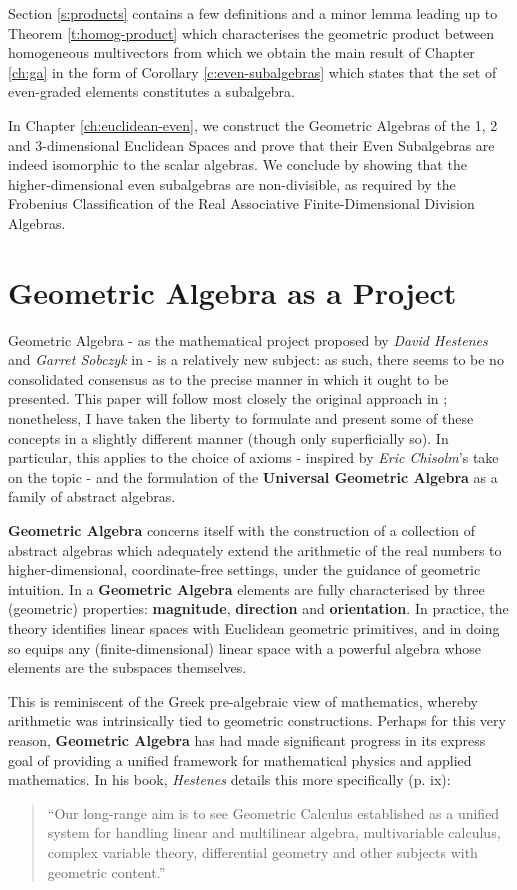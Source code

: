 Section \ref{s:products} contains a few definitions and a minor lemma leading up to Theorem \ref{t:homog-product} which characterises the geometric product between homogeneous multivectors from which we obtain the main result of Chapter \ref{ch:ga} in the form of Corollary \ref{c:even-subalgebras} which states that the set of even-graded elements constitutes a subalgebra.

In Chapter \ref{ch:euclidean-even}, we construct the Geometric Algebras of the 1, 2 and 3-dimensional Euclidean Spaces and prove that their Even Subalgebras are indeed isomorphic to the scalar algebras. We conclude by showing that the higher-dimensional even subalgebras are non-divisible, as required by the Frobenius Classification of the Real Associative Finite-Dimensional Division Algebras.

\newpage

\section{Geometric Algebra as a Project}
Geometric Algebra - as the mathematical project proposed by \textit{David Hestenes} and \textit{Garret Sobczyk} in \cite{ga-origin} - is a relatively new subject: as such, there seems to be no consolidated consensus as to the precise manner in which it ought to be presented. This paper will follow most closely the original approach in \cite{ga-origin}; nonetheless, I have taken the liberty to formulate and present some of these concepts in a slightly different manner (though only superficially so). In particular, this applies to the choice of axioms - inspired by \textit{Eric Chisolm}'s take on the topic \cite{ga-chisolm} - and the formulation of the \textbf{Universal Geometric Algebra} as a family of abstract algebras.

\textbf{Geometric Algebra} concerns itself with the construction of a collection of abstract algebras which adequately extend the arithmetic of the real numbers to higher-dimensional, coordinate-free settings, under the guidance of geometric intuition. In a \textbf{Geometric Algebra} elements are fully characterised by three (geometric) properties: \textbf{magnitude}, \textbf{direction} and \textbf{orientation}. In practice, the theory identifies linear spaces with Euclidean geometric primitives, and in doing so equips any (finite-dimensional) linear space with a powerful algebra whose elements are the subspaces themselves.

This is reminiscent of the Greek pre-algebraic view of mathematics, whereby arithmetic was intrinsically tied to geometric constructions. 
Perhaps for this very reason, \textbf{Geometric Algebra} has had made significant progress in its express goal of providing a unified framework for mathematical physics and applied mathematics. In his book, \textit{Hestenes} details this more specifically (p. ix)\cite{ga-origin}:

\begin{quote}
	``Our long-range aim is to see Geometric Calculus established as a unified system for handling linear and multilinear algebra, multivariable calculus, complex variable theory, differential geometry and other subjects with geometric content.''
\end{quote}
